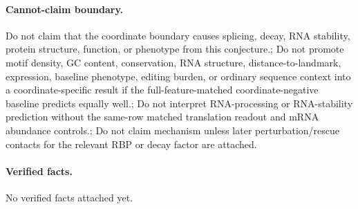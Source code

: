 \paragraph{Cannot-claim boundary.} Do not claim that the coordinate boundary causes splicing, decay, RNA stability, protein structure, function, or phenotype from this conjecture.; Do not promote motif density, GC content, conservation, RNA structure, distance-to-landmark, expression, baseline phenotype, editing burden, or ordinary sequence context into a coordinate-specific result if the full-feature-matched coordinate-negative baseline predicts equally well.; Do not interpret RNA-processing or RNA-stability prediction without the same-row matched translation readout and mRNA abundance controls.; Do not claim mechanism unless later perturbation/rescue contacts for the relevant RBP or decay factor are attached.

\paragraph{Verified facts.}
No verified facts attached yet.
